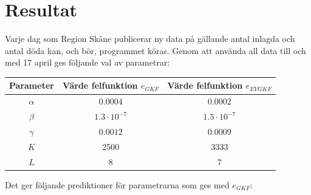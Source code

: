 \documentclass[a4paper, 12pt]{article}
\theoremstyle{definition}
\begin{document}
\section{Resultat}
Varje dag som Region Skåne publicerar ny data på  gällande antal inlagda och antal döda kan, och bör, programmet köras. Genom att använda all data till och med 17 april ges följande val av parametrar:

\begin{center}
  \begin{tabular}{c | c | c}
    \textbf{Parameter} & \textbf{Värde felfunktion $e_{GKF}$} & \textbf{Värde felfunktion $e_{EVGKF}$} \\ \hline
    $\alpha$ & $0.0004$ & $0.0002$\\ \hline
    $\beta$ & $1.3\cdot 10^{-7}$ & $1.5\cdot 10^{-7}$ \\ \hline
    $\gamma$ & $0.0012$ & $0.0009$\\ \hline
    $K$ & 2500 & 3333 \\ \hline
    $L$ & 8 & 7
  \end{tabular}
\end{center}
Det ger följande prediktioner för parametrarna som ges med $e_{GKF}$:
\end{document}
